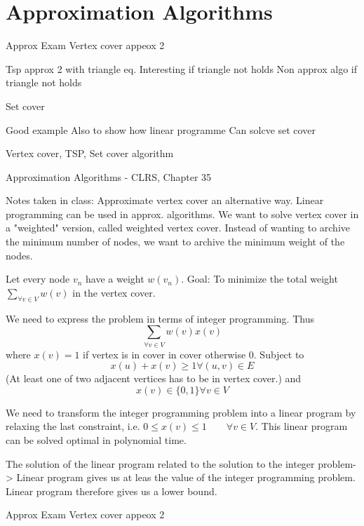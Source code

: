 \documentclass[10pt]{article}
\begin{document}
\section{Approximation Algorithms} %
\label{sec:approximation_algorithms}


Approx Exam
Vertex cover appeox 2

Tsp approx 2 with triangle eq. Interesting if triangle not holds
Non approx algo if triangle not holds

Set cover

Good example Also to show how linear programme Can solcve set cover

Vertex cover, TSP, Set cover algorithm

Approximation Algorithms - CLRS, Chapter 35

Notes taken in class:
Approximate vertex cover an alternative way. Linear programming can be used in approx. algorithms. We want to solve vertex cover in a "weighted" version, called weighted vertex cover. Instead of wanting to archive the minimum number of nodes, we want to archive the minimum weight of the nodes.

Let every node $v_n$ have a weight $w(v_n)$. Goal: To minimize the total weight $\sum_{\forall v \in V} w(v)$ in the vertex cover. 


We need to express the problem in terms of integer programming. Thus
\begin{equation}
\sum_{\forall v \in V} w(v) x(v)  
\end{equation}
where $x(v)=1$ if vertex is in cover in cover otherwise 0. Subject to
\begin{equation}
  x(u)+x(v) \geq 1 \forall (u,v) \in E
\end{equation}
(At least one of two adjacent vertices has to be in vertex cover.) and
\begin{equation}
    x(v)  \in \{0,1\} \forall v \in V 
\end{equation}

We need to transform the integer programming problem into a linear program by relaxing the last constraint, i.e. $0 \leq x(v) \leq 1 \qquad \forall v \in V$. This linear program can be solved optimal in polynomial time. 

The solution of the linear program related to the solution to the integer problem-> Linear program gives us at leas the value of the integer programming problem. Linear program therefore gives us a lower bound.

Approx Exam
Vertex cover appeox 2
\end{document}

